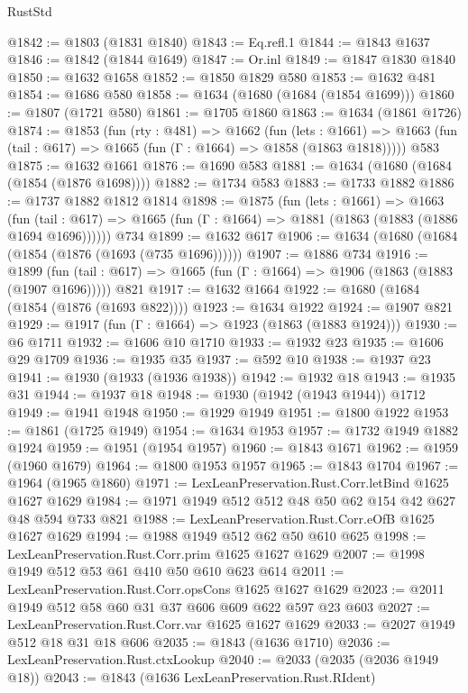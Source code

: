 \begin{lexlean}{RustStd}
\begin{coremodule}
@1842 := @1803 (@1831 @1840)
@1843 := Eq.refl.{1}
@1844 := @1843 @1637
@1846 := @1842 (@1844 @1649)
@1847 := Or.inl
@1849 := @1847 @1830 @1840
@1850 := @1632 @1658
@1852 := @1850 @1829 @580
@1853 := @1632 @481
@1854 := @1686 @580
@1858 := @1634 (@1680 (@1684 (@1854 @1699)))
@1860 := @1807 (@1721 @580)
@1861 := @1705 @1860
@1863 := @1634 (@1861 @1726)
@1874 := @1853
    (fun (rty : @481) =>
    @1662
      (fun (lets : @1661) =>
      @1663 (fun (tail : @617) => @1665 (fun (Γ : @1664) => @1858 (@1863 @1818)))))
    @583
@1875 := @1632 @1661
@1876 := @1690 @583
@1881 := @1634 (@1680 (@1684 (@1854 (@1876 @1698))))
@1882 := @1734 @583
@1883 := @1733 @1882
@1886 := @1737 @1882 @1812 @1814
@1898 := @1875
    (fun (lets : @1661) =>
    @1663
      (fun (tail : @617) => @1665 (fun (Γ : @1664) => @1881 (@1863 (@1883 (@1886 @1694 @1696))))))
    @734
@1899 := @1632 @617
@1906 := @1634 (@1680 (@1684 (@1854 (@1876 (@1693 (@735 @1696))))))
@1907 := @1886 @734
@1916 := @1899
    (fun (tail : @617) => @1665 (fun (Γ : @1664) => @1906 (@1863 (@1883 (@1907 @1696)))))
    @821
@1917 := @1632 @1664
@1922 := @1680 (@1684 (@1854 (@1876 (@1693 @822))))
@1923 := @1634 @1922
@1924 := @1907 @821
@1929 := @1917 (fun (Γ : @1664) => @1923 (@1863 (@1883 @1924)))
@1930 := @6 @1711
@1932 := @1606 @10 @1710
@1933 := @1932 @23
@1935 := @1606 @29 @1709
@1936 := @1935 @35
@1937 := @592 @10
@1938 := @1937 @23
@1941 := @1930 (@1933 (@1936 @1938))
@1942 := @1932 @18
@1943 := @1935 @31
@1944 := @1937 @18
@1948 := @1930 (@1942 (@1943 @1944)) @1712
@1949 := @1941 @1948
@1950 := @1929 @1949
@1951 := @1800 @1922
@1953 := @1861 (@1725 @1949)
@1954 := @1634 @1953
@1957 := @1732 @1949 @1882 @1924
@1959 := @1951 (@1954 @1957)
@1960 := @1843 @1671
@1962 := @1959 (@1960 @1679)
@1964 := @1800 @1953 @1957
@1965 := @1843 @1704
@1967 := @1964 (@1965 @1860)
@1971 := LexLeanPreservation.Rust.Corr.letBind @1625 @1627 @1629
@1984 := @1971 @1949 @512 @512 @48 @50 @62 @154 @42 @627 @48 @594 @733 @821
@1988 := LexLeanPreservation.Rust.Corr.eOfB @1625 @1627 @1629
@1994 := @1988 @1949 @512 @62 @50 @610 @625
@1998 := LexLeanPreservation.Rust.Corr.prim @1625 @1627 @1629
@2007 := @1998 @1949 @512 @53 @61 @410 @50 @610 @623 @614
@2011 := LexLeanPreservation.Rust.Corr.opsCons @1625 @1627 @1629
@2023 := @2011 @1949 @512 @58 @60 @31 @37 @606 @609 @622 @597 @23 @603
@2027 := LexLeanPreservation.Rust.Corr.var @1625 @1627 @1629
@2033 := @2027 @1949 @512 @18 @31 @18 @606
@2035 := @1843 (@1636 @1710)
@2036 := LexLeanPreservation.Rust.ctxLookup
@2040 := @2033 (@2035 (@2036 @1949 @18))
@2043 := @1843 (@1636 LexLeanPreservation.Rust.RIdent)

\end{coremodule}
\end{lexlean}
